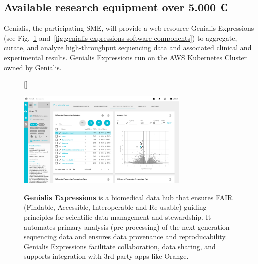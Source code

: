 \documentclass[11pt,a4paper]{article}
\renewcommand{\bold}{\textbf}
\begin{document}
\subsection{Available research equipment over 5.000 €}

Genialis, the participating SME, will provide a web resource Genialis Expressions (see Fig.~\ref{fig:genialis-expressions-frontend} and~\ref{fig:genialis-expressions-software-components}) to aggregate, curate, and analyze high-throughput sequencing data and associated clinical and experimental results. Genialis Expressions run on the AWS Kubernetes Cluster owned by Genialis.

\begin{figure}[htbp]
[\FBwidth]
{\caption{\small\bold{Genialis Expressions} is a biomedical data hub that ensures FAIR (Findable, Accessible, Interoperable and Re-usable) guiding principles for scientific data management and stewardship. It automates primary analysis (pre-processing) of the next generation sequencing data and ensures data provenance and reproducability. Genialis Expressions facilitate collaboration, data sharing, and supports integration with 3rd-party apps like Orange.}
\label{fig:genialis-expressions-frontend}}
{\includegraphics[width=0.73\textwidth]{genialis-expressions-frontend}}
\end{figure}
\end{document}

